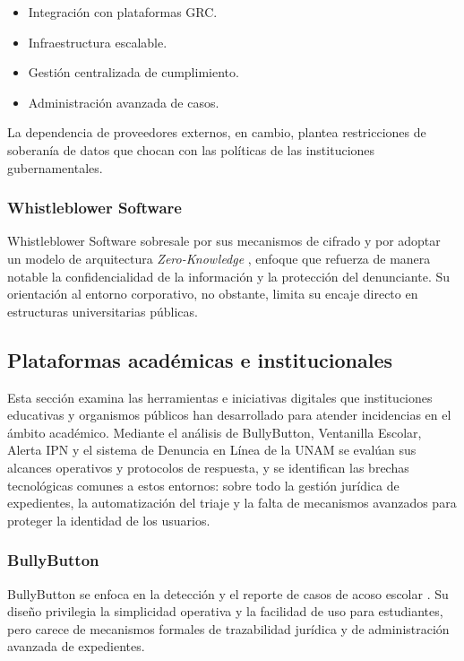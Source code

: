 	\begin{itemize}
		\item Integración con plataformas GRC.
		\item Infraestructura escalable.
		\item Gestión centralizada de cumplimiento.
		\item Administración avanzada de casos.
	\end{itemize}
	
	La dependencia de proveedores externos, en cambio, plantea restricciones de soberanía de datos que
	chocan con las políticas de las instituciones gubernamentales.
	
	\subsubsection{Whistleblower Software}
	Whistleblower Software sobresale por sus mecanismos de cifrado y por adoptar un modelo de
	arquitectura \textit{Zero-Knowledge} \cite{whistleblower_software}, enfoque que refuerza de manera
	notable la confidencialidad de la información y la protección del denunciante. Su orientación al
	entorno corporativo, no obstante, limita su encaje directo en estructuras universitarias públicas.
	
	\subsection{Plataformas académicas e institucionales}
	Esta sección examina las herramientas e iniciativas digitales que instituciones educativas y
	organismos públicos han desarrollado para atender incidencias en el ámbito académico. Mediante el
	análisis de BullyButton, Ventanilla Escolar, Alerta IPN y el sistema de Denuncia en Línea de la
	UNAM se evalúan sus alcances operativos y protocolos de respuesta, y se identifican las brechas
	tecnológicas comunes a estos entornos: sobre todo la gestión jurídica de expedientes, la
	automatización del triaje y la falta de mecanismos avanzados para proteger la identidad de los
	usuarios.
	
	\subsubsection{BullyButton}
	BullyButton se enfoca en la detección y el reporte de casos de acoso escolar \cite{bully_button}. Su
	diseño privilegia la simplicidad operativa y la facilidad de uso para estudiantes, pero carece de
	mecanismos formales de trazabilidad jurídica y de administración avanzada de expedientes.
	

